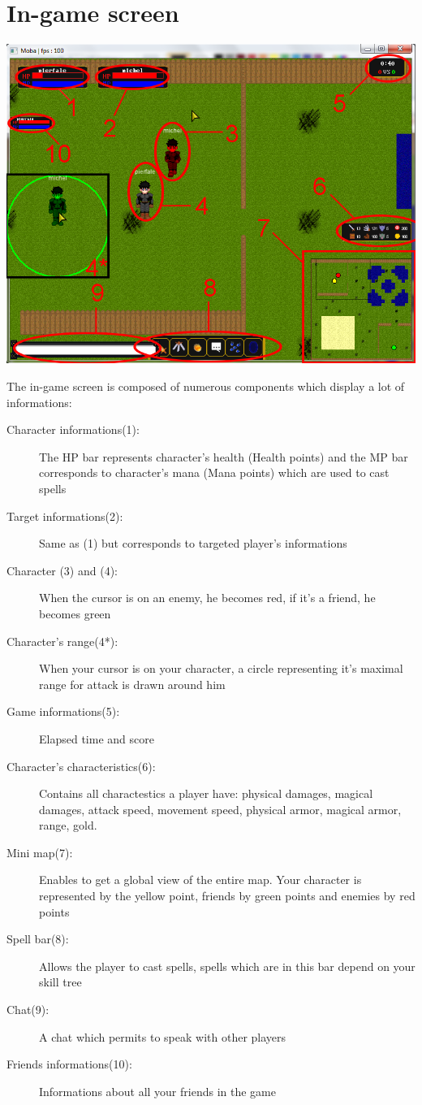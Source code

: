 \documentclass{scrreprt}
\begin{document}
		  \section{In-game screen}
		  \begin{center}
		  \includegraphics[scale=0.4]{in_game.png}
		  \end{center}
		  The in-game screen is composed of numerous components which display a lot of informations:
		  \begin{description}
		  \item[Character informations(1):]{The HP bar represents character's health (Health points) and the MP bar corresponds to character's mana (Mana points) which are used to cast spells}
		  \item[Target informations(2):]{Same as (1) but corresponds to targeted player's informations}
		  \item[Character (3) and (4):]{When the cursor is on an enemy, he becomes red, if it's a friend, he becomes green}
		  \item[Character's range(4*):]{When your cursor is on your character, a circle representing it's maximal range for attack is drawn around him}
		  \item[Game informations(5):]{Elapsed time and score}
		  \item[Character's characteristics(6):]{Contains all charactestics a player have: physical damages, magical damages, attack speed, movement speed, physical armor, magical armor, range, gold.}
		  \item[Mini map(7):]{Enables to get a global view of the entire map. Your character is represented by the yellow point, friends by green points and enemies by red points}
		  \item[Spell bar(8):]{Allows the player to cast spells, spells which are in this bar depend on your skill tree}
		  \item[Chat(9):]{A chat which permits to speak with other players}
		  \item[Friends informations(10):]{Informations about all your friends in the game}
		  \end{description}
\end{document}
